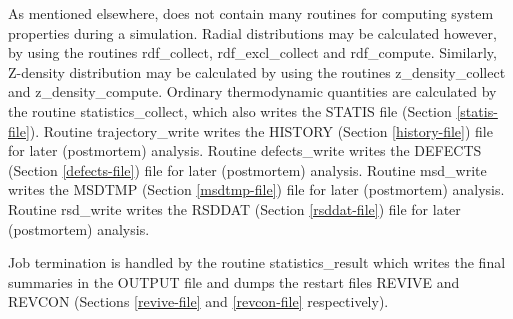 As mentioned elsewhere, \D does not contain many routines for
computing system properties during a simulation.  Radial
distributions may be calculated however, by using the routines
{\sc rdf\_collect}, {\sc rdf\_excl\_collect} and {\sc rdf\_compute}.
Similarly, Z-density distribution may be calculated by using the
routines {\sc z\_density\_collect} and {\sc z\_density\_compute}.
Ordinary thermodynamic quantities are calculated by the routine
{\sc statistics\_collect}, which also writes the STATIS file (Section
\ref{statis-file}).  Routine {\sc trajectory\_write} writes the
HISTORY (Section \ref{history-file}) file for later (postmortem)
analysis.  Routine {\sc defects\_write} writes the DEFECTS (Section
\ref{defects-file}) file for later (postmortem) analysis.  Routine
{\sc msd\_write} writes the MSDTMP (Section \ref{msdtmp-file})
file for later (postmortem) analysis.  Routine {\sc rsd\_write}
writes the RSDDAT (Section \ref{rsddat-file}) file for later
(postmortem) analysis.

Job termination is handled by the routine {\sc statistics\_result}
which writes the final summaries in the OUTPUT file and dumps the
restart files REVIVE and REVCON (Sections \ref{revive-file} and
\ref{revcon-file} respectively).
